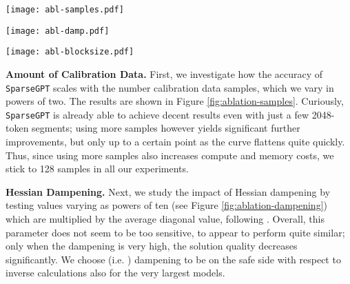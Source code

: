 \documentclass{article}
\theoremstyle{plain}
\theoremstyle{definition}
\theoremstyle{remark}
\renewcommand{\paragraph}[1]{\vspace{-0.1em} \noindent \textbf{#1}}
\newcommand{\sparsegpt}[1]{\texttt{SparseGPT}}
\begin{document}
\begin{figure*}[h]
    \centering
    \begin{minipage}[c]{.32\textwidth}
        \centering
        \texttt{[image: abl-samples.pdf]}
        \vspace{-20pt}
        \label{fig:ablation-samples}
    \end{minipage}
    \begin{minipage}[c]{.32\textwidth}
        \centering
        \texttt{[image: abl-damp.pdf]}
        \vspace{-20pt}
        \label{fig:ablation-dampening}
    \end{minipage}
    \begin{minipage}[c]{.32\textwidth}
        \centering
        \texttt{[image: abl-blocksize.pdf]}
        \vspace{-20pt}
        \label{fig:ablation-blocksize}
    \end{minipage}
\end{figure*}

\paragraph{Amount of Calibration Data.} First, we investigate how the accuracy of \sparsegpt{} scales with the number calibration data samples, which we vary in powers of two. The results are shown in Figure \ref{fig:ablation-samples}. Curiously, \sparsegpt{} is already able to achieve decent results even with just a few 2048-token segments; using more samples however yields significant further improvements, but only up to a certain point as the curve flattens quite quickly. Thus, since using more samples also increases compute and memory costs, we stick to 128 samples in all our experiments.

\paragraph{Hessian Dampening.} Next, we study the impact of Hessian dampening by testing values varying as powers of ten (see Figure \ref{fig:ablation-dampening}) which are multiplied by the average diagonal value, following \cite{frantar2022gptq}. Overall, this parameter does not seem to be too sensitive,  to  appear to perform quite similar; only when the dampening is very high, the solution quality decreases significantly. We choose  (i.e. ) dampening to be on the safe side with respect to inverse calculations also for the very largest models.
\end{document}
